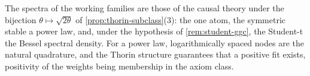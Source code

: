 The spectra of the working families are those of the causal theory under the bijection
$\theta \mapsto \sqrt{2\theta}$ of \ref{prop:thorin-subclass}(3): the \Matern{} one atom, the
symmetric stable a power law, and, under the hypothesis of \ref{rem:student-ggc}, the Student-t
the Bessel spectral density. For a power law,
logarithmically spaced nodes are the natural quadrature, and the Thorin structure guarantees
that a positive fit exists, positivity of the weights being membership in the axiom class.

